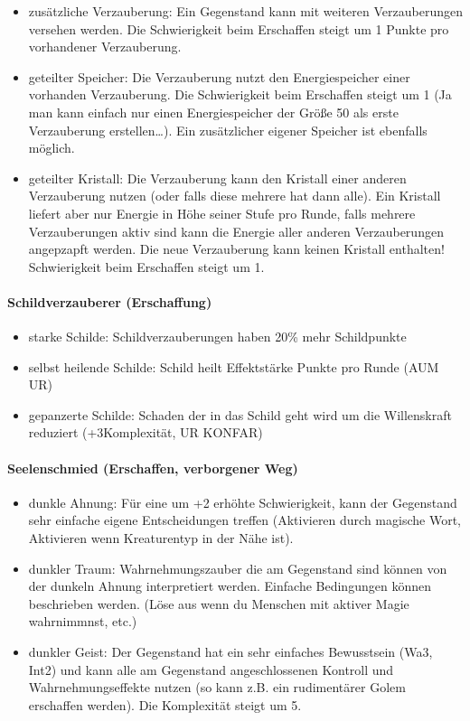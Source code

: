\documentclass{article}
\begin{document}
\begin{itemize}
\item zusätzliche Verzauberung: Ein Gegenstand kann mit weiteren Verzauberungen versehen werden. Die Schwierigkeit beim Erschaffen steigt um 1 Punkte pro vorhandener Verzauberung.
\item geteilter Speicher: Die Verzauberung nutzt den Energiespeicher einer vorhanden Verzauberung. Die Schwierigkeit beim Erschaffen steigt um 1 (Ja man kann einfach nur einen Energiespeicher der Größe 50 als erste Verzauberung erstellen…). Ein zusätzlicher eigener Speicher ist ebenfalls möglich.
\item geteilter Kristall: Die Verzauberung kann den Kristall einer anderen Verzauberung nutzen (oder falls diese mehrere hat dann alle). Ein Kristall liefert aber nur Energie in Höhe seiner Stufe pro Runde, falls mehrere Verzauberungen aktiv sind kann die Energie aller anderen Verzauberungen angepzapft werden. Die neue Verzauberung kann keinen Kristall enthalten! Schwierigkeit beim Erschaffen steigt um 1.
\end{itemize}

\paragraph{Schildverzauberer (Erschaffung)}

\begin{itemize}
\item starke Schilde: Schildverzauberungen haben 20\% mehr Schildpunkte
\item selbst heilende Schilde: Schild heilt Effektstärke Punkte pro Runde (AUM UR)
\item gepanzerte Schilde: Schaden der in das Schild geht wird um die Willenskraft reduziert (+3Komplexität, UR KONFAR)
\end{itemize}

\paragraph{Seelenschmied (Erschaffen, verborgener Weg)}

\begin{itemize}
\item dunkle Ahnung: Für eine um +2 erhöhte Schwierigkeit, kann der Gegenstand sehr einfache eigene Entscheidungen treffen (Aktivieren durch magische Wort, Aktivieren wenn Kreaturentyp in der Nähe ist).
\item dunkler Traum: Wahrnehmungszauber die am Gegenstand sind können von der dunkeln Ahnung interpretiert werden. Einfache Bedingungen können beschrieben werden. (Löse aus wenn du Menschen mit aktiver Magie wahrnimmnst, etc.)
\item dunkler Geist: Der Gegenstand hat ein sehr einfaches Bewusstsein (Wa3, Int2) und kann alle am Gegenstand angeschlossenen Kontroll und Wahrnehmungseffekte nutzen (so kann z.B. ein rudimentärer Golem erschaffen werden). Die Komplexität steigt um 5.
\end{itemize}
\end{document}

